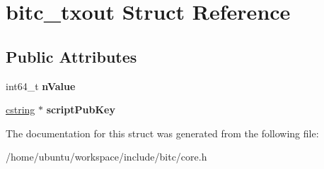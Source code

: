 \hypertarget{structbitc__txout}{\section{bitc\-\_\-txout Struct Reference}
\label{structbitc__txout}
}
\subsection*{Public Attributes}
\begin{DoxyCompactItemize}
\item 
\hypertarget{structbitc__txout_a24983f6b8fa9e7e9c1af04883fe87b28}{int64\-\_\-t {\bfseries n\-Value}}\label{structbitc__txout_a24983f6b8fa9e7e9c1af04883fe87b28}

\item 
\hypertarget{structbitc__txout_a4d9e56dca66a47aee5af2f43218e3535}{\hyperlink{structcstring}{cstring} $\ast$ {\bfseries script\-Pub\-Key}}\label{structbitc__txout_a4d9e56dca66a47aee5af2f43218e3535}

\end{DoxyCompactItemize}


The documentation for this struct was generated from the following file\-:\begin{DoxyCompactItemize}
\item 
/home/ubuntu/workspace/include/bitc/core.\-h\end{DoxyCompactItemize}
